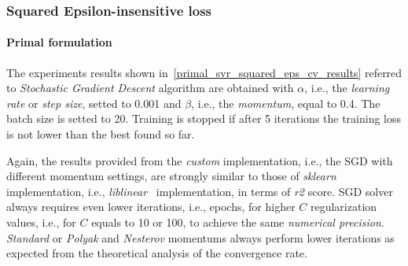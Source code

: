 \subsubsection{Squared Epsilon-insensitive loss}

\paragraph{Primal formulation}

The experiments results shown in~\ref{primal_svr_squared_eps_cv_results} referred to \emph{Stochastic Gradient Descent} algorithm are obtained with $\alpha$, i.e., the \emph{learning rate} or \emph{step size}, setted to 0.001 and $\beta$, i.e., the \emph{momentum}, equal to 0.4. The batch size is setted to 20. Training is stopped if after 5 iterations the training loss is not lower than the best found so far.



Again, the results provided from the \emph{custom} implementation, i.e., the SGD with different momentum settings, are strongly similar to those of \emph{sklearn} implementation, i.e., \emph{liblinear}~\cite{fan2008liblinear} implementation, in terms of \emph{r2} score. SGD solver always requires even lower iterations, i.e., epochs, for higher $C$ regularization values, i.e., for $C$ equals to 10 or 100, to achieve the same \emph{numerical precision}. \emph{Standard} or \emph{Polyak} and \emph{Nesterov} momentums always perform lower iterations as expected from the theoretical analysis of the convergence rate.

